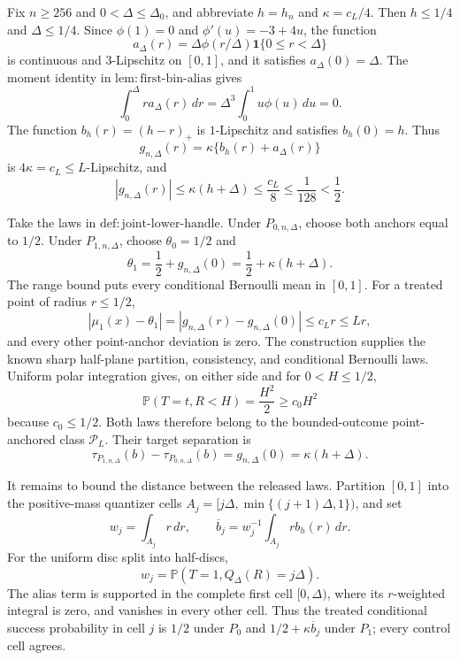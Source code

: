 Fix \(n\geq256\) and \(0<\Delta\leq\Delta_0\), and abbreviate \(h=h_n\) and \(\kappa=c_L/4\).  Then \(h\leq1/4\) and \(\Delta\leq1/4\).  Since \(\phi(1)=0\) and \(\phi'(u)=-3+4u\), the function
\[
 a_\Delta(r)=\Delta\phi(r/\Delta)\mathbf1\{0\leq r<\Delta\}
\]
is continuous and \(3\)-Lipschitz on \([0,1]\), and it satisfies \(a_\Delta(0)=\Delta\).  The moment identity in \(\mathrm{lem:first\text{-}bin\text{-}alias}\) gives
\[
 \int_0^\Delta ra_\Delta(r)\,dr
 =\Delta^3\int_0^1u\phi(u)\,du=0.
\]
The function \(b_h(r)=(h-r)_+\) is \(1\)-Lipschitz and satisfies \(b_h(0)=h\).  Thus
\[
 g_{n,\Delta}(r)=\kappa\{b_h(r)+a_\Delta(r)\}
\]
is \(4\kappa=c_L\leq L\)-Lipschitz, and
\[
 |g_{n,\Delta}(r)|
 \leq\kappa(h+\Delta)
 \leq\frac{c_L}{8}
 \leq\frac1{128}<\frac12.
\]

Take the laws in \(\mathrm{def:joint\text{-}lower\text{-}handle}\).  Under \(P_{0,n,\Delta}\), choose both anchors equal to \(1/2\).  Under \(P_{1,n,\Delta}\), choose \(\theta_0=1/2\) and
\[
 \theta_1=\frac12+g_{n,\Delta}(0)
 =\frac12+\kappa(h+\Delta).
\]
The range bound puts every conditional Bernoulli mean in \([0,1]\).  For a treated point of radius \(r\leq1/2\),
\[
 |\mu_1(x)-\theta_1|
 =|g_{n,\Delta}(r)-g_{n,\Delta}(0)|
 \leq c_Lr\leq Lr,
\]
and every other point-anchor deviation is zero.  The construction supplies the known sharp half-plane partition, consistency, and conditional Bernoulli laws.  Uniform polar integration gives, on either side and for \(0<H\leq1/2\),
\[
 \mathbb P(T=t,R<H)=\frac{H^2}{2}\geq c_0H^2
\]
because \(c_0\leq1/2\).  Both laws therefore belong to the bounded-outcome point-anchored class \(\mathcal P_L\).  Their target separation is
\[
 \tau_{P_{1,n,\Delta}}(b)-\tau_{P_{0,n,\Delta}}(b)
 =g_{n,\Delta}(0)=\kappa(h+\Delta).
\]

It remains to bound the distance between the released laws.  Partition \([0,1]\) into the positive-mass quantizer cells \(A_j=[j\Delta,\min\{(j+1)\Delta,1\})\), and set
\[
 w_j=\int_{A_j}r\,dr,
 \qquad
 \overline b_j=w_j^{-1}\int_{A_j}rb_h(r)\,dr.
\]
For the uniform disc split into half-discs,
\[
 w_j=\mathbb P(T=1,Q_\Delta(R)=j\Delta).
\]
The alias term is supported in the complete first cell \([0,\Delta)\), where its \(r\)-weighted integral is zero, and vanishes in every other cell.  Thus the treated conditional success probability in cell \(j\) is \(1/2\) under \(P_0\) and \(1/2+\kappa\overline b_j\) under \(P_1\); every control cell agrees.

